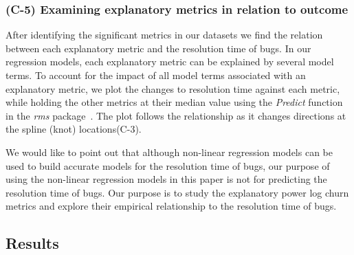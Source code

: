 \subsubsection*{(C-5) Examining explanatory metrics in relation to outcome}
After identifying the significant metrics in our datasets we find the relation between each explanatory metric and the resolution time of bugs. In our regression models, each explanatory metric can be explained by several model terms. To account for the impact of all model terms associated with an explanatory metric, we plot the changes to resolution time against each metric, while holding the other metrics at their median value using the \emph{Predict} function in the \emph{rms} package~\cite{rmsPackage}. The plot follows the relationship as it changes directions at the spline (knot) locations(C-3). 

We would like to point out that although non-linear regression models can be used to build accurate models for the resolution time of bugs, our purpose of using the non-linear regression models in this paper is not for predicting the resolution time of bugs. Our purpose is to study the explanatory power log churn metrics and explore their empirical relationship to the resolution time of bugs.%



\subsection*{\textbf{Results}}

